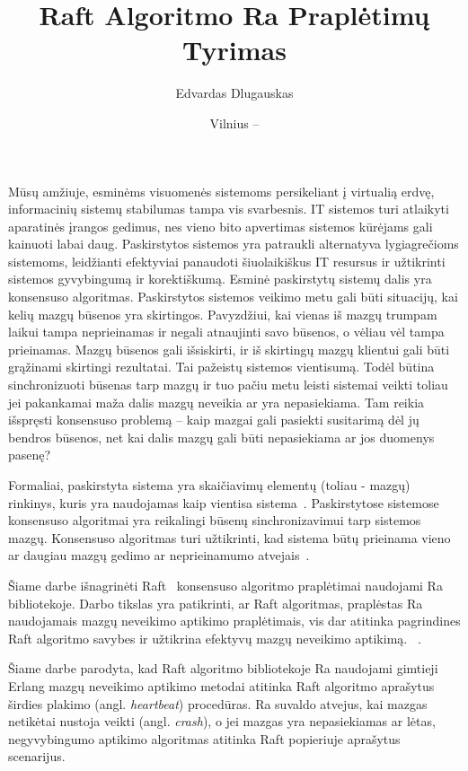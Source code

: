 \documentclass{VUMIFPSkursinis}
\title{Raft Algoritmo Ra Praplėtimų Tyrimas}
\author{Edvardas Dlugauskas}
\date{Vilnius – \the\year}
\begin{document}
\maketitle
\listoftodos
\tableofcontents


Mūsų amžiuje, esminėms visuomenės sistemoms persikeliant į virtualią erdvę, informacinių sistemų stabilumas tampa vis svarbesnis. IT sistemos turi atlaikyti aparatinės įrangos gedimus, nes vieno bito apvertimas sistemos kūrėjams gali kainuoti labai daug. Paskirstytos sistemos yra patraukli alternatyva lygiagrečioms sistemoms, leidžianti efektyviai panaudoti šiuolaikiškus IT resursus ir užtikrinti sistemos gyvybingumą ir korektiškumą. Esminė paskirstytų sistemų dalis yra konsensuso algoritmas. Paskirstytos sistemos veikimo metu gali būti situacijų, kai kelių mazgų būsenos yra skirtingos. Pavyzdžiui, kai vienas iš mazgų trumpam laikui tampa neprieinamas ir negali atnaujinti savo būsenos, o vėliau vėl tampa prieinamas. Mazgų būsenos gali išsiskirti, ir iš skirtingų mazgų klientui gali būti grąžinami skirtingi rezultatai. Tai pažeistų sistemos vientisumą. Todėl būtina sinchronizuoti būsenas tarp mazgų ir tuo pačiu metu leisti sistemai veikti toliau jei pakankamai maža dalis mazgų neveikia ar yra nepasiekiama. Tam reikia išspręsti konsensuso problemą -- kaip mazgai gali pasiekti susitarimą dėl jų bendros būsenos, net kai dalis mazgų gali būti nepasiekiama ar jos duomenys pasenę?

Formaliai, paskirstyta sistema yra skaičiavimų elementų (toliau - mazgų) rinkinys, kuris yra naudojamas kaip vientisa sistema~\cite{steen_distributed_2017}. Paskirstytose sistemose konsensuso algoritmai yra reikalingi būsenų sinchronizavimui tarp sistemos mazgų. Konsensuso algoritmas turi užtikrinti, kad sistema būtų prieinama vieno ar daugiau mazgų gedimo ar neprieinamumo atvejais~\cite{ongaro_consensus}. 

Šiame darbe išnagrinėti Raft~\cite{ongaro_consensus} konsensuso algoritmo praplėtimai naudojami Ra bibliotekoje. Darbo tikslas yra patikrinti, ar Raft algoritmas, praplėstas Ra naudojamais mazgų neveikimo aptikimo praplėtimais, vis dar atitinka pagrindines Raft algoritmo savybes ir užtikrina efektyvų mazgų neveikimo aptikimą. ~\cite{ongaro_consensus, rabbitmqra}.

Šiame darbe parodyta, kad Raft algoritmo bibliotekoje Ra naudojami gimtieji Erlang mazgų neveikimo aptikimo metodai atitinka Raft algoritmo aprašytus širdies plakimo (angl. \textit{heartbeat}) procedūras. Ra suvaldo atvejus, kai mazgas netikėtai nustoja veikti (angl. \textit{crash}), o jei mazgas yra nepasiekiamas ar lėtas, negyvybingumo aptikimo algoritmas atitinka Raft popieriuje aprašytus scenarijus.
\end{document}
